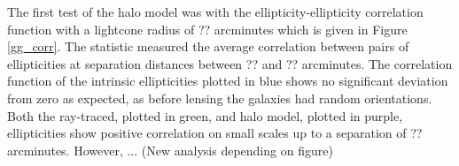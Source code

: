 \documentclass[%
 reprint,
 amsmath,amssymb,
 aps,nofootinbib
]{revtex4-1}
\begin{document}

The first test of the halo model was with the ellipticity-ellipticity correlation function with a lightcone radius of ?? arcminutes which is given in Figure \ref{gg_corr}. The statistic measured the average correlation between pairs of ellipticities at separation distances between ?? and ?? arcminutes. The correlation function of the intrinsic ellipticities plotted in blue shows no significant deviation from zero as expected, as before lensing the galaxies had random orientations. Both the ray-traced, plotted in green, and halo model, plotted in purple, ellipticities show positive correlation on small scales up to a separation of ?? arcminutes. However, ... (New analysis depending on figure)
\end{document}
